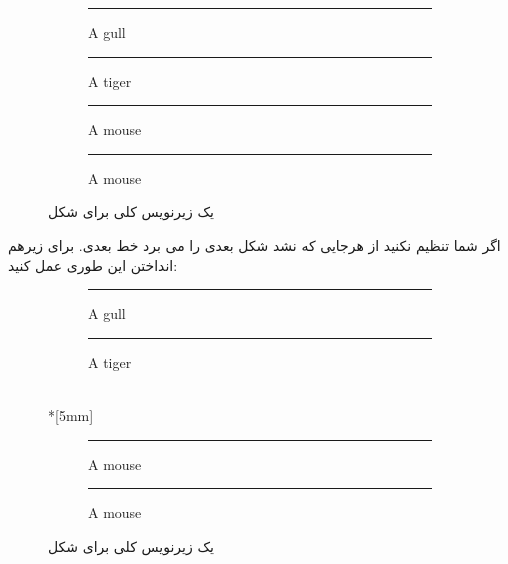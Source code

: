 \documentclass{report}
\begin{document}
\begin{figure}[ht]
\centering
\begin{subfigure}[b]{0.3\textwidth}\centering
\rule{2cm}{2cm}
\caption{A gull}
\label{fig:gull}
\end{subfigure}
\begin{subfigure}[b]{0.3\textwidth}\centering
\rule{2cm}{2cm}
\caption{A tiger}
\label{fig:tiger}
\end{subfigure}
\begin{subfigure}[b]{0.3\textwidth}\centering
\rule{2cm}{2cm}
\caption{A mouse}
\label{fig:mouse}
\end{subfigure}
\begin{subfigure}[b]{0.3\textwidth}\centering
\rule{2cm}{2cm}
\caption{A mouse}
\label{fig:mouse}
\end{subfigure}
\caption{یک زیرنویس کلی برای شکل}
\label{fig:animals}
\end{figure}
اگر شما تنظیم نکنید از هرجایی که نشد شکل بعدی را می برد خط بعدی.  برای زیرهم انداختن این طوری عمل کنید:
\begin{figure}[ht]
\centering
\begin{subfigure}[b]{0.3\textwidth}\centering
\rule{2cm}{2cm}
\caption{A gull}
\label{fig:gull}
\end{subfigure}
\begin{subfigure}[b]{0.3\textwidth}\centering
\rule{2cm}{2cm}
\caption{A tiger}
\label{fig:tiger}
\end{subfigure}\\*[5mm]
\begin{subfigure}[b]{0.3\textwidth}\centering
\rule{2cm}{2cm}
\caption{A mouse}
\label{fig:mouse}
\end{subfigure}
\begin{subfigure}[b]{0.3\textwidth}\centering
\rule{2cm}{2cm}
\caption{A mouse}
\label{fig:mouse}
\end{subfigure}
\caption{یک زیرنویس کلی برای شکل}
\label{fig:dddd}
\end{figure}
\end{document}
